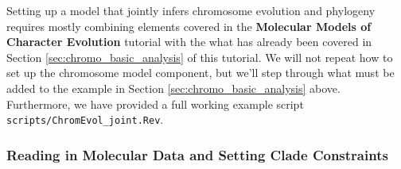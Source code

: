 Setting up a model that jointly infers chromosome evolution and phylogeny requires mostly combining
elements covered in the \textbf{Molecular Models of Character Evolution} tutorial with the
what has already been covered in Section \ref{sec:chromo_basic_analysis} of this tutorial. We will not repeat how to set up the chromosome model
component, but we'll step through what must be added to the example in Section \ref{sec:chromo_basic_analysis} above.
Furthermore, we have provided a full working example script \texttt{scripts/ChromEvol\_joint.Rev}.

\subsubsection{Reading in Molecular Data and Setting Clade Constraints}

